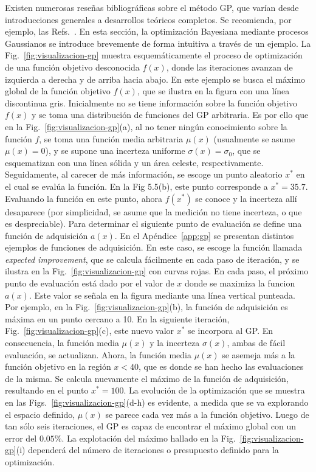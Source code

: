 Existen numerosas reseñas bibliográficas sobre el método GP, que varían 
desde introducciones generales a desarrollos teóricos completos. 
Se recomienda, por ejemplo, las Refs.~\cite{Rasmussen:06,Murphy:12}. 
En esta sección, la optimización Bayesiana mediante procesos Gaussianos 
se introduce brevemente de forma intuitiva a través de un ejemplo. 
La Fig.~\ref{fig:visualizacion-gp} muestra esquemáticamente el proceso 
de optimización de una función objetivo desconocida $f(x)$, donde las 
iteraciones avanzan de izquierda a derecha y de arriba hacia abajo. En 
este ejemplo se busca el máximo global de la función objetivo $f(x)$, 
que se ilustra en la figura con una línea discontinua gris. 
Inicialmente no se tiene información sobre la función objetivo $f(x)$ y 
se toma una distribución de funciones del GP arbitraria. Es por ello que
en la Fig.~\ref{fig:visualizacion-gp}(a), al no tener ningún 
conocimiento sobre la función $f$, se toma una función media arbitraria
$\mu(x)$ (usualmente se asume $\mu(x)=0$), y se supone una incerteza 
uniforme $\sigma(x)=\sigma_0$, que se esquematizan con una línea sólida 
y un área celeste, respectivamente. 
Seguidamente, al carecer de más información, se escoge un punto 
aleatorio $x^*$ en el cual se evalúa la función. En la Fig 5.5(b), este 
punto corresponde a $x^*=35.7$. Evaluando la función en este punto, 
ahora $f(x^*)$ se conoce y la incerteza allí desaparece (por simplicidad, 
se asume que la medición no tiene incerteza, o que es despreciable). 
Para determinar el siguiente punto de evaluación se define una función 
de adquisición $a(x)$. En el Apéndice~\ref{app:gp} se presentan 
distintos ejemplos de funciones de adquisición. En este caso, se escoge 
la función llamada \textit{expected improvement}, que se calcula 
fácilmente en cada paso de iteración, y se ilustra en la 
Fig.~\ref{fig:visualizacion-gp} con curvas rojas. 
En cada paso, el próximo punto de evaluación está dado por el valor de 
$x$ donde se maximiza la funcion $a(x)$. Este valor se señala en la figura 
mediante una línea vertical punteada. Por ejemplo, en la 
Fig.~\ref{fig:visualizacion-gp}(b), la función de adquisición es máxima 
en un punto cercano a 10. En la siguiente iteración, 
Fig.~\ref{fig:visualizacion-gp}(c), este nuevo valor $x^*$ se incorpora 
al GP. En consecuencia, la función media $\mu(x)$ y la incerteza 
$\sigma(x)$, ambas de fácil evaluación, se actualizan.
Ahora, la función media $\mu(x)$ se asemeja más a la función objetivo en 
la región $x<40$, que es donde se han hecho las evaluaciones de la misma. 
Se calcula nuevamente el máximo de la función de adquisición, resultando 
en el punto $x^*=100$. La evolución de la optimización que se 
muestra en las Figs.~\ref{fig:visualizacion-gp}(d-h) es evidente, a 
medida que se va explorando el espacio definido, $\mu(x)$ se parece cada 
vez más a la función objetivo. Luego de tan sólo seis 
iteraciones, el GP es capaz de encontrar el máximo global con un error 
del $0.05\%$. La explotación del máximo hallado en la 
Fig.~\ref{fig:visualizacion-gp}(i) dependerá del número de iteraciones 
o presupuesto definido para la optimización. 

